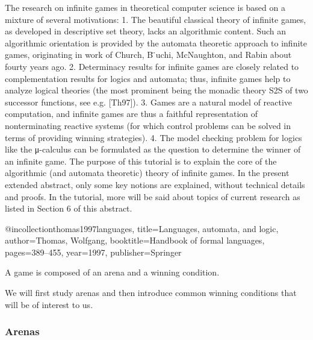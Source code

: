 \documentclass[a4paper,UKenglish,cleveref, autoref, thm-restate]{lipics-v2021}
\newcommand\mh[1]{\todo[inline,size=\scriptsize]{#1 - \textbf{Mathieu}}}
\begin{document}
The research on infinite games in theoretical computer science is based on a
mixture of several motivations:
1. The beautiful classical theory of infinite games, as developed in descriptive
set theory, lacks an algorithmic content. Such an algorithmic orientation is
provided by the automata theoretic approach to infinite games, originating
in work of Church, B ̈uchi, McNaughton, and Rabin about fourty years ago.
2. Determinacy results for infinite games are closely related to complementation
results for logics and automata; thus, infinite games help to analyze logical
theories (the most prominent being the monadic theory S2S of two successor
functions, see e.g. [Th97]).
3. Games are a natural model of reactive computation, and infinite games are
thus a faithful representation of nonterminating reactive systems (for which
control problems can be solved in terms of providing winning strategies).
4. The model checking problem for logics like the μ-calculus can be formulated
as the question to determine the winner of an infinite game.
The purpose of this tutorial is to explain the core of the algorithmic (and
automata theoretic) theory of infinite games. In the present extended abstract,
only some key notions are explained, without technical details and proofs. In the
tutorial, more will be said about topics of current research as listed in Section 6
of this abstract.

@incollection{thomas1997languages,
  title={Languages, automata, and logic},
  author={Thomas, Wolfgang},
  booktitle={Handbook of formal languages},
  pages={389--455},
  year={1997},
  publisher={Springer}
}


\fi


A game is composed of an arena and a winning condition.

We will ﬁrst study
arenas and
 then introduce common winning conditions that will be of interest to us.




 \subsubsection{Arenas}
\end{document}
